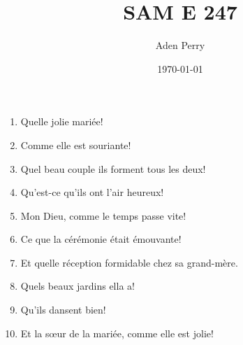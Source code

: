 \documentclass{article}
\title{SAM E 247}
\author{Aden Perry}
\date{\today}
\begin{document}
\maketitle

\begin{enumerate}
    \item Quelle jolie mariée!
    \item Comme elle est souriante!
    \item Quel beau couple ils forment tous les deux!
    \item Qu'est-ce qu'ils ont l'air heureux!
    \item Mon Dieu, comme le temps passe vite!
    \item Ce que la cérémonie était émouvante!
    \item Et quelle réception formidable chez sa grand-mère.
    \item Quels beaux jardins ella a!
    \item Qu'ils dansent bien!
    \item Et la sœur de la mariée, comme elle est jolie!
\end{enumerate}
\end{document}
